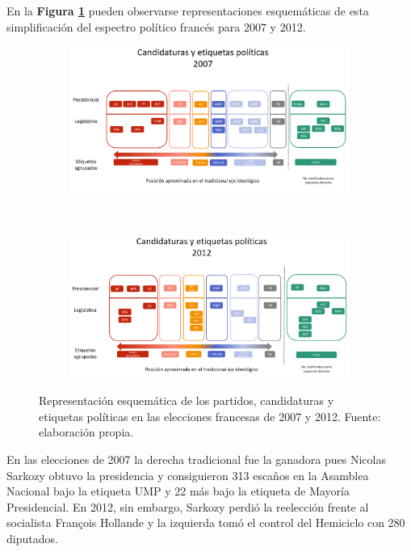 En la \textbf{Figura \ref{fig:Partidos_07_12}} pueden observarse representaciones esquemáticas de esta simplificación del espectro político francés para 2007 y 2012.\\

\begin{figure}[h]
	\centering
	\begin{subfigure}{0.9\textwidth}
	\includegraphics[width = \textwidth]{Figs/FN_Francia/Partidos_07}
	\end{subfigure}	
	~
	\begin{subfigure}{0.9\textwidth}
	\includegraphics[width = \textwidth]{Figs/FN_Francia/Partidos_12}
	\end{subfigure}		
	\caption{Representación esquemática de los partidos, candidaturas y etiquetas políticas en las elecciones francesas de 2007 y 2012. Fuente: elaboración propia.}
	\label{fig:Partidos_07_12}	
\end{figure}

En las elecciones de 2007 la derecha tradicional fue la ganadora pues Nicolas Sarkozy obtuvo la presidencia y consiguieron 313 escaños en la Asamblea Nacional bajo la etiqueta UMP y 22 más bajo la etiqueta de Mayoría Presidencial. En 2012, sin embargo, Sarkozy perdió la reelección frente al socialista François Hollande y la izquierda tomó el control del Hemiciclo con 280 diputados.\\ 

